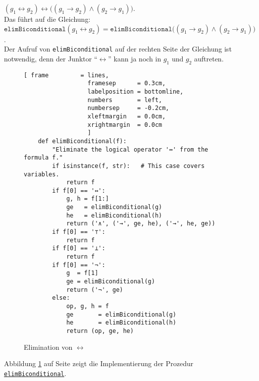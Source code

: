 \begin{enumerate}
      $(g_1 \leftrightarrow g_2) \leftrightarrow \bigl( (g_1 \rightarrow g_2) \wedge (g_2 \rightarrow g_1)\bigr)$.
      \\[0.2cm]
      Das führt auf die Gleichung:
      \\[0.2cm]
      \hspace*{1.3cm} 
      $\texttt{elimBiconditional}(g_1 \leftrightarrow g_2) = \texttt{elimBiconditional}\bigl( (g_1 \rightarrow g_2) \wedge (g_2 \rightarrow g_1)\bigr)$. 
      \\[0.2cm]
      Der Aufruf von \texttt{elimBiconditional} auf der rechten Seite der Gleichung ist notwendig,
      denn der Junktor ``$\leftrightarrow$'' kann ja noch in $g_1$ und $g_2$ auftreten.
\end{enumerate}


\begin{figure}[!ht]
  \centering
\begin{Verbatim}[ frame         = lines, 
                  framesep      = 0.3cm, 
                  labelposition = bottomline,
                  numbers       = left,
                  numbersep     = -0.2cm,
                  xleftmargin   = 0.0cm,
                  xrightmargin  = 0.0cm
                  ]
    def elimBiconditional(f):
        "Eliminate the logical operator '↔' from the formula f."
        if isinstance(f, str):   # This case covers variables.
            return f
        if f[0] == '↔':
            g, h = f[1:]
            ge   = elimBiconditional(g)
            he   = elimBiconditional(h)
            return ('∧', ('→', ge, he), ('→', he, ge))
        if f[0] == '⊤':
            return f
        if f[0] == '⊥':
            return f
        if f[0] == '¬':
            g  = f[1]
            ge = elimBiconditional(g)
            return ('¬', ge)
        else:
            op, g, h = f
            ge       = elimBiconditional(g)
            he       = elimBiconditional(h)
            return (op, ge, he)
\end{Verbatim}
\vspace*{-0.3cm}
  \caption{Elimination von $\leftrightarrow$}
  \label{fig:elimBiconditional}
\end{figure} 
Abbildung
\ref{fig:elimBiconditional} auf Seite \pageref{fig:elimBiconditional} zeigt die Implementierung der
Prozedur 
\href{https://github.com/karlstroetmann/Logik/blob/master/Python/CNF.ipynb}{\texttt{elimBiconditional}}.
